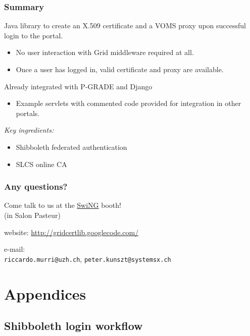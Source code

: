 \documentclass{beamer}
\newcommand{\+}{\vspace{1em}}
\begin{document}
\begin{frame}[label=summary]
  \frametitle{Summary}
  
  Java library to create an X.509 certificate and a VOMS proxy upon
  successful login to the portal.
  \begin{itemize}
  \item No user interaction with Grid middleware required at all.
  \item Once a user has logged in, valid certificate and proxy are
    available.
  \end{itemize}

  \+
  Already integrated with P-GRADE and Django
  \begin{itemize}
  \item Example servlets with commented code provided for integration
    in other portals.
  \end{itemize}

  \+
  \emph{Key ingredients:}
  \begin{itemize}
  \item Shibboleth federated authentication
  \item SLCS online CA
  \end{itemize}
\end{frame}


\begin{frame}
  \frametitle{Any questions?}
  \begin{center}\Large
    {Come talk to us at the 
      \href{http://www.swing-grid.ch/}{SwiNG} booth!
      \\ (in Salon Pasteur)}

    \+
    website: \url{http://gridcertlib.googlecode.com/}

    \+
    e-mail: 
    \\
    \texttt{riccardo.murri@uzh.ch}, \texttt{peter.kunszt@systemsx.ch}
  \end{center}
\end{frame}




\section{Appendices}


\subsection{Shibboleth login workflow}
\end{document}
